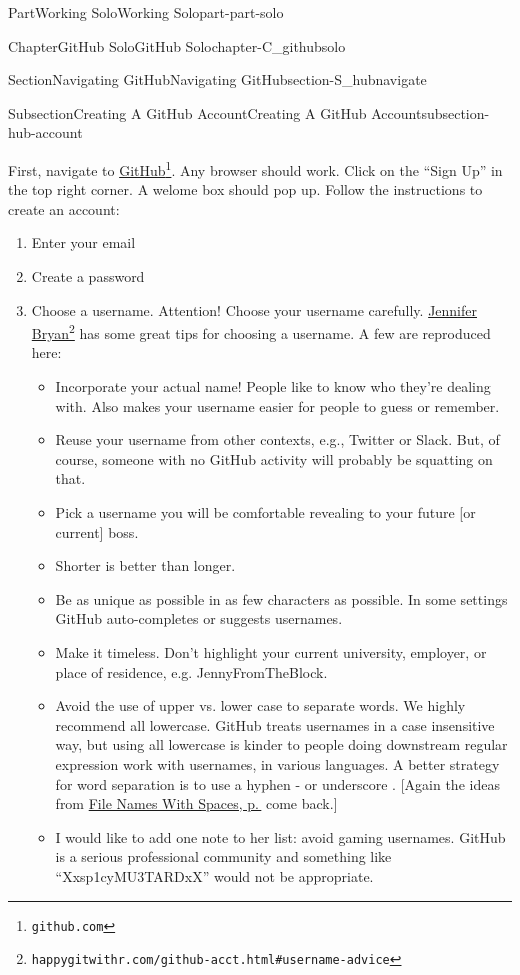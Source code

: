 \documentclass[twoside,10pt,]{book}
\begin{document}
\begin{partptx}{Part}{Working Solo}{}{Working Solo}{}{}{part-part-solo}
\begin{chapterptx}{Chapter}{GitHub Solo}{}{GitHub Solo}{}{}{chapter-C_githubsolo}
\begin{sectionptx}{Section}{Navigating GitHub}{}{Navigating GitHub}{}{}{section-S_hubnavigate}
\begin{subsectionptx}{Subsection}{Creating A GitHub Account}{}{Creating A GitHub Account}{}{}{subsection-hub-account}
\par
First, navigate to \href{https://github.com}{GitHub}\footnote{\nolinkurl{github.com}\label{fn-hub-account-e-b}}. Any browser should work. Click on the ``Sign Up'' in the top right corner. A welome box should pop up. Follow the instructions to create an account:%
\begin{enumerate}
\item{}Enter your email%
\item{}Create a password%
\item{}Choose a username. Attention! Choose your username carefully. \href{https://happygitwithr.com/github-acct.html\#username-advice}{Jennifer Bryan}\footnote{\nolinkurl{happygitwithr.com/github-acct.html\#username-advice}\label{fn-hub-account-e-d-c-a-b}} has some great tips for choosing a username. A few are reproduced here:%
\begin{itemize}[label=\textbullet]
\item{}Incorporate your actual name! People like to know who they're dealing with. Also makes your username easier for people to guess or remember.%
\item{}Reuse your username from other contexts, e.g., Twitter or Slack. But, of course, someone with no GitHub activity will probably be squatting on that.%
\item{}Pick a username you will be comfortable revealing to your future [or current] boss.%
\item{}Shorter is better than longer.%
\item{}Be as unique as possible in as few characters as possible. In some settings GitHub auto-completes or suggests usernames.%
\item{}Make it timeless. Don't highlight your current university, employer, or place of residence, e.g. JennyFromTheBlock.%
\item{}Avoid the use of upper vs. lower case to separate words. We highly recommend all lowercase. GitHub treats usernames in a case insensitive way, but using all lowercase is kinder to people doing downstream regular expression work with usernames, in various languages. A better strategy for word separation is to use a hyphen - or underscore \textunderscore{}. [Again the ideas from \hyperlink{paragraphs-namesspaces}{File Names With Spaces, p.\,\pageref{paragraphs-namesspaces}} come back.]%
\item{}I would like to add one note to her list: avoid gaming usernames. GitHub is a serious professional community and something like ``Xx\textunderscore{}sp1cyMU3TARD\textunderscore{}xX'' would not be appropriate.%

\end{itemize}
\end{enumerate}
\end{subsectionptx}
\end{sectionptx}
\end{chapterptx}
\end{partptx}
\end{document}

